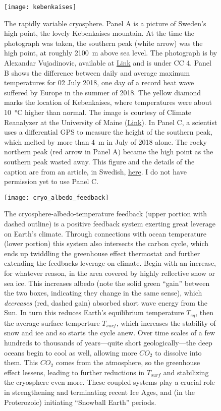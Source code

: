 \begin{figure}[p]
\centering
\texttt{[image: kebenkaises]}%
\caption{The rapidly variable cryosphere. Panel A is a picture of Sweden's high point, the lovely Kebenkaises mountain. At the time the photograph was taken, the southern peak (white arrow) was the high point, at roughly \SI{2100}{\metre} above sea level. The photograph is by Alexandar Vujadinovic, available at \href{https://upload.wikimedia.org/wikipedia/commons/thumb/4/45/Kebnekaise_viewed_from_Tarfala_valley_-_narrower_crop.jpg/1024px-Kebnekaise_viewed_from_Tarfala_valley_-_narrower_crop.jpg}{Link} and is under CC 4. Panel B shows the difference between daily and average maximum temperatures for 02 July 2018, one day of a record heat wave suffered by Europe in the summer of 2018. The yellow diamond marks the location of Kebenkaises, where temperatures were about \SI{10}{\celsius} higher than normal. The image is courtesy of Climate Reanalyzer at the University of Maine (\href{https://climatereanalyzer.org/reanalysis/daily_maps/}{Link}). In Panel C, a scientist uses a differential GPS to measure the height of the southern peak, which melted by more than \SI{4}{\metre} in July of 2018 alone. The rocky northern peak (red arrow in Panel A) became the high point as the southern peak wasted away. This figure and the details of the caption are from an article, in Swedish, \href{http://www.mynewsdesk.com/se/su/pressreleases/kebnekaises-sydtopp-blir-laegre-aen-nordtoppen-i-augusti-2611533}{here}. I do not have permission yet to use Panel C.} 
\label{fig:kebenkaises}
\end{figure} 


\begin{figure}[p]
\centering
\texttt{[image: cryo\_albedo\_feedback]}%
\caption{The cryosphere-albedo-temperature feedback (upper portion with dashed outline) is a positive feedback system exerting great leverage on Earth's climate. Through connections with ocean temperature (lower portion) this system also intersects the carbon cycle, which ends up twiddling the greenhouse effect thermostat and further extending the feedbacks leverage on climate. Begin with an increase, for whatever reason, in the area covered by highly reflective snow or sea ice. This increases albedo (note the solid green ``gain'' between the two boxes, indicating they change in the same sense), which \emph{decreases} (red, dashed gain) absorbed short wave energy from the Sun. In turn this reduces Earth's equilibrium temperature $T_{eq}$, then the average surface temperture $T_{surf}$, which increases the stability of snow and ice and so starts the cycle anew. Over time scales of a few hundreds to thousands of years---quite short geologically---the deep oceans begin to cool as well, allowing more $CO_2$ to dissolve into them. This $CO_2$ comes from the atmosphere, so the greenhouse effect lessens, leading to further reductions in $T_{surf}$ and stabilizing the cryosphere even more. These coupled systems play a crucial role in strengthening and terminating recent Ice Ages, and (in the Proterozoic) initiating ``Snowball Earth'' periods.} 
\label{fig:cryo_albedo_feedback}
\end{figure}




